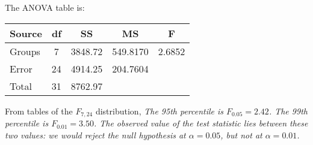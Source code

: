 \begin{solution}
The ANOVA table is:
\begin{center}
\begin{tabular}{|l|c|c|c|c|} \hline
Source	& df	& SS		& MS		& F 			\\ \hline
Groups	& 7		& 3848.72	& 549.8170	& 2.6852		\\ \hline
Error	& 24	& 4914.25	& 204.7604 	& 			\\ \hline
Total	& 31	& 8762.97 	& 			&			\\ \hline
\end{tabular}\par
\end{center}

From tables of the $F_{7,24}$ distribution, 
\bit
\it The 95th percentile is $F_{0.05} = 2.42$.
\it The 99th percentile is $F_{0.01} = 3.50$.
\eit
The observed value of the test statistic lies between these two values: we would reject the null hypothesis at $\alpha=0.05$, but not at $\alpha=0.01$.
\end{solution}
